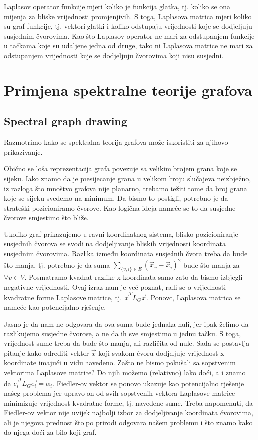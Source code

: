 \documentclass[11pt]{article}
\begin{document}
	Laplasov operator funkcije mjeri koliko je funkcija glatka, tj. koliko se ona mijenja za bliske vrijednosti promjenjivih.
	S toga, Laplasova matrica mjeri koliko su graf funkcije, tj. vektori glatki i koliko odstupaju vrijednosti koje se dodjeljuju susjednim čvorovima.
	Kao što Laplasov operator ne mari za odstupanjem funkcije u tačkama koje su udaljene jedna od druge, tako ni Laplasova matrice ne mari za odstupanjem vrijednosti koje se dodjeljuju čvorovima koji nisu susjedni.
	
	\section{Primjena spektralne teorije grafova}

	\subsection{Spectral graph drawing}
	Razmotrimo kako se spektralna teorija grafova može iskoristiti za njihovo prikazivanje. 

	Obično se loša reprezentacija grafa povezuje sa velikim brojem grana koje se sijeku.
	Iako znamo da je presijecanje grana u velikom broju slučajeva neizbježno, iz razloga što mnoštvo grafova nije planarno,
	trebamo težiti tome da broj grana koje se sijeku svedemo na minimum.
    Da bismo to postigli, potrebno je da strateški pozicioniramo čvorove.
	Kao logična ideja nameće se to da susjedne čvorove smjestimo što bliže.
    
	Ukoliko graf prikazujemo u ravni koordinatnog sistema, blisko pozicioniranje susjednih čvorova se svodi na dodjeljivanje bliskih vrijednosti koordinata susjednim čvorovima.
    Razlika između koordinata susjednih čvora treba da bude što manja, tj. potrebno je da suma $\sum_{\{v,i\} \in E} (\vec{x}_v - \vec{x}_i)^2$ bude što manja za $\forall v \in V$.
	Posmatramo kvadrat razlike x koordinata samo zato da bismo izbjegli negativne vrijednosti.
    Ovaj izraz nam je već poznat, radi se o vrijednosti kvadratne forme Laplasove matrice, tj. $\vec{x}^T L_G \vec{x}$. Ponovo, Laplasova matrica se nameće kao potencijalno rješenje.

    Jasno je da nam ne odgovara da ova suma bude jednaka nuli, jer ipak želimo da razlikujemo susjedne čvorove, a ne da ih sve smjestimo u jednu tačku. S toga, vrijednost sume treba da bude što manja, ali različita od nule.
    Sada se postavlja pitanje kako odrediti vektor $\vec{x}$ koji svakom čvoru dodjeljuje vrijednost x koordinate imajući u vidu navedeno. 
	Zašto ne bismo pokušali sa sopstvenim vektorima Laplasove matrice?
    Do njih možemo (relativno) lako doći, a i znamo da $\vec{e_i}^T L_G \vec{e_i} = \alpha_i$.
	Fiedler-ov vektor se ponovo ukazuje kao potencijalno rješenje našeg problema jer upravo on od svih sopstvenih vektora Laplasove matrice minimizuje vrijednost kvadratne forme, tj. navedene sume.
    Treba napomenuti, da Fiedler-ov vektor nije uvijek najbolji izbor za dodjeljivanje koordinata čvorovima, ali je njegova prednost što po prirodi odgovara našem problemu i što znamo kako do njega doći za bilo koji graf.
    
\end{document}

